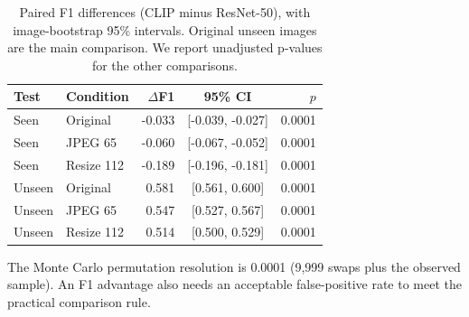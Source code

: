 \begin{table}[!htbp]\centering\resulttable
\caption{Paired F1 differences (CLIP minus ResNet-50), with image-bootstrap 95\% intervals. Original unseen images are the main comparison. We report unadjusted p-values for the other comparisons.}\label{tab:paired}
\begin{tabularx}{\linewidth}{@{}llrCr@{}}\toprule
Test & Condition & $\Delta$F1 & 95\% CI & $p$\\\midrule
Seen & Original & -0.033 & [-0.039, -0.027] & 0.0001\\
Seen & JPEG 65 & -0.060 & [-0.067, -0.052] & 0.0001\\
Seen & Resize 112 & -0.189 & [-0.196, -0.181] & 0.0001\\
Unseen & Original & 0.581 & [0.561, 0.600] & 0.0001\\
Unseen & JPEG 65 & 0.547 & [0.527, 0.567] & 0.0001\\
Unseen & Resize 112 & 0.514 & [0.500, 0.529] & 0.0001\\
\bottomrule\end{tabularx}
\par\smallskip\parbox{\linewidth}{\footnotesize The Monte Carlo permutation resolution is 0.0001 (9,999 swaps plus the observed sample). An F1 advantage also needs an acceptable false-positive rate to meet the practical comparison rule.}
\end{table}
